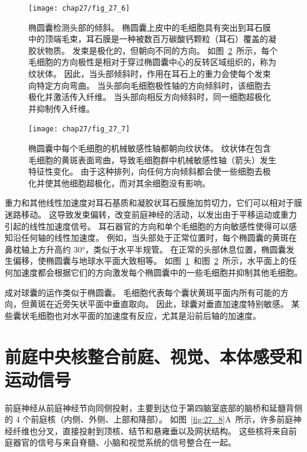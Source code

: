 \begin{figure}[htbp]
	\centering
	\texttt{[image: chap27/fig\_27\_6]}
	\caption{椭圆囊检测头部的倾斜。
		椭圆囊上皮中的毛细胞具有突出到耳石膜中的顶端毛束，耳石膜是一种被数百万碳酸钙颗粒（耳石）覆盖的凝胶状物质。
		发束是极化的，但朝向不同的方向。
		如图~\ref{fig:27_7}~所示，每个毛细胞的方向极性是相对于穿过椭圆囊中心的反转区域组织的，称为纹状体。
		因此，当头部倾斜时，作用在耳石上的重力会使每个发束向特定方向弯曲。
		当头部向毛细胞极性轴的方向倾斜时，该细胞去极化并激活传入纤维。
		当头部向相反方向倾斜时，同一细胞超极化并抑制传入纤维\cite{iurato2013submicroscopic}。}
	\label{fig:27_6}
\end{figure}


\begin{figure}[htbp]
	\centering
	\texttt{[image: chap27/fig\_27\_7]}
	\caption{椭圆囊中每个毛细胞的机械敏感性轴都朝向纹状体。
		纹状体在包含毛细胞的黄斑表面弯曲，导致毛细胞群中机械敏感性轴（箭头）发生特征性变化。
		由于这种排列，向任何方向倾斜都会使一些细胞去极化并使其他细胞超极化，而对其余细胞没有影响\cite{spoendlin2016ultrastructure}。}
	\label{fig:27_7}
\end{figure}


重力和其他线性加速度对耳石基质和凝胶状耳石膜施加剪切力，它们可以相对于膜迷路移动。
这导致发束偏转，改变前庭神经的活动，以发出由于平移运动或重力引起的线性加速度信号。
耳石器官的方向和单个毛细胞的方向敏感性使得可以感知沿任何轴的线性加速度。
例如，当头部处于正常位置时，每个椭圆囊的黄斑在鼻枕轴上方升高约 30°，类似于水平半规管。
在正常的头部休息位置，椭圆囊发生偏移，使椭圆囊与地球水平面大致相等。
如图~\ref{fig:27_6}~和图~\ref{fig:27_7}~所示，水平面上的任何加速度都会根据它们的方向激发每个椭圆囊中的一些毛细胞并抑制其他毛细胞。


成对球囊的运作类似于椭圆囊。
毛细胞代表每个囊状黄斑平面内所有可能的方向，但黄斑在近旁矢状平面中垂直取向。
因此，球囊对垂直加速度特别敏感。
某些囊状毛细胞也对水平面的加速度有反应，尤其是沿前后轴的加速度。



\section{前庭中央核整合前庭、视觉、本体感受和运动信号}

前庭神经从前庭神经节向同侧投射，主要到达位于第四脑室底部的脑桥和延髓背侧的 4 个前庭核（内侧、外侧、上部和降部）。
如图~\ref{fig:27_8}A~所示，许多前庭神经纤维也分叉，直接投射到顶核、结节和悬雍垂以及网状结构。
这些核将来自前庭器官的信号与来自脊髓、小脑和视觉系统的信号整合在一起。


